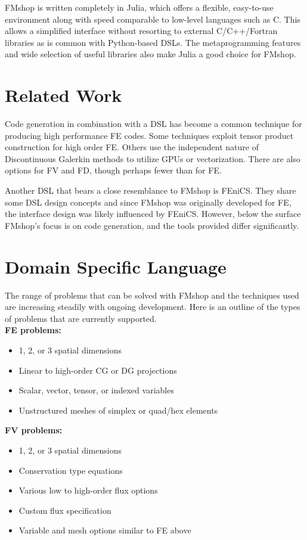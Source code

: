 \documentclass[twoside,leqno,twocolumn]{article}
\begin{document}
FMshop is written completely in Julia, which offers a flexible, easy-to-use environment along with speed comparable to low-level languages such as C\cite{juliabench}. This allows a simplified interface without resorting to external C/C++/Fortran libraries as is common with Python-based DSLs. The metaprogramming features and wide selection of useful libraries also make Julia a good choice for FMshop.

\section{Related Work}
Code generation in combination with a DSL has become a common technique for producing high performance FE codes. Some techniques exploit tensor product construction for high order FE\cite{yateto}\cite{mcrae}\cite{homolya}. Others use the independent nature of Discontinuous Galerkin methods to utilize GPUs\cite{seisol} or vectorization\cite{kempf}. There are also options for FV\cite{pietro} and FD\cite{macia}, though perhaps fewer than for FE.

Another DSL that bears a close resemblance to FMshop is FEniCS. They share some DSL design concepts and since FMshop was originally developed for FE, the interface design was likely influenced by FEniCS. However, below the surface FMshop's focus is on code generation, and the tools provided differ significantly.

\section{Domain Specific Language}
The range of problems that can be solved with FMshop and the techniques used are increasing steadily with ongoing development. Here is an outline of the types of problems that are currently supported.\\
\textbf{FE problems:}
\begin{itemize}
\item 1, 2, or 3 spatial dimensions
\item Linear to high-order CG or DG projections
\item Scalar, vector, tensor, or indexed variables
\item Unstructured meshes of simplex or quad/hex elements
\end{itemize}
\textbf{FV problems:}
\begin{itemize}
\item 1, 2, or 3 spatial dimensions
\item Conservation type equations
\item Various low to high-order flux options
\item Custom flux specification
\item Variable and mesh options similar to FE above
\end{itemize}
\end{document}
